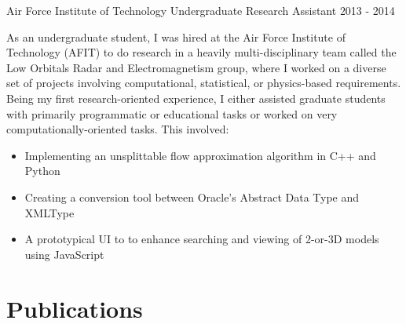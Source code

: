 \documentclass[11pt,a4paper,sans]{moderncv} %
\begin{document}
			 {Air Force Institute of Technology}
			 {Undergraduate Research Assistant}
			 {2013 - 2014}{}{\vspace{3pt}
As an undergraduate student, I was hired at the Air Force Institute of Technology (AFIT) to do research in a heavily multi-disciplinary team called the Low Orbitals Radar and Electromagnetism group, where I worked on a diverse set of projects involving computational, statistical, or physics-based requirements. Being my first research-oriented experience, I either assisted graduate students with primarily programmatic or educational tasks or worked on very computationally-oriented tasks. This involved: 
\begin{itemize}
	\item Implementing an unsplittable flow approximation algorithm in C++ and Python
	\item Creating a conversion tool between Oracle's Abstract Data Type and XMLType
	\item A prototypical UI to to enhance searching and viewing of 2-or-3D models using JavaScript
\end{itemize}	
}
\section{Publications}




\end{document}
